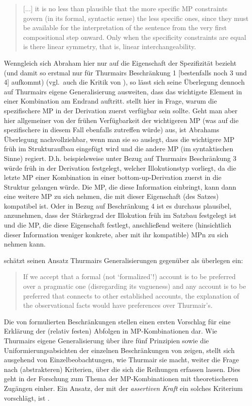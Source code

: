 \begin{quotation}
[...] it is no less than plausible that the more specific MP constraints \\ govern (in its formal, syntactic sense) the less specific ones, since they must be available for the interpretation of the sentence from the very first compositional step onward. Only when the specificity constraints are equal is there linear symmetry, that is, linear interchangeability.
\end{quotation}
Wenngleich sich Abraham hier nur auf die Eigenschaft der Spezifizität bezieht (und damit so erstmal nur für Thurmairs Beschränkung 1 [bestenfalls noch 3 und 4] aufkommt) (vgl.\ auch die Kritik von \citealt[229]{Rinas2006}), so lässt sich seine Überlegung dennoch auf Thurmairs eigene Generalisierung ausweiten, dass das wichtigste Element in einer Kombination am Endrand auftritt. \citet[229]{Rinas2006} stellt hier in Frage, warum die spezifischere MP in der Derivation zuerst verfügbar sein sollte. Geht man aber hier allgemeiner von der frühen Verfügbarkeit der wichtigeren MP (was auf die spezifischere in diesem Fall ebenfalls zu\-treffen würde) aus, ist Abrahams Überlegung nachvollziehbar, wenn man sie so auslegt, dass die wichtigere MP früh im Strukturaufbau eingefügt wird und die andere MP (im syntaktischen Sinne) regiert. D.h. beispielsweise unter Bezug auf Thurmairs Beschränkung 3 würde früh in der Derivation festgelegt, welcher Illokutionstyp vorliegt, da die letzte MP einer Kombination in einer bottom-up-Derivation zuerst in die Struktur gelangen würde. Die MP, die diese Information einbringt, kann dann eine weitere MP zu sich nehmen, die mit dieser Eigenschaft (des Satzes) kompatibel ist. Oder in Bezug auf Beschränkung 4 ist es durchaus plausibel, anzunehmen, dass der Stärkegrad der Illokution früh im Satzbau festgelegt ist und die MP, die diese Eigenschaft festlegt, anschließend weitere (hinsichtlich dieser Information weniger konkrete, aber mit ihr kompatible) MPn zu sich neh\-men kann.

\citet[118]{Abraham1991a} schätzt seinen Ansatz Thurmairs Generalisierungen gegenüber als überlegen ein:
\begin{quotation}
If we accept that a formal (not `formalized'!) account is to be preferred over a pragmatic one (disregarding its vagueness) and any account is to be preferred that connects to other established accounts, the explanation of the observational facts would have preferences over Thurmair’s.
\end{quotation}
Die von \citet{Thurmair1989, Thurmair1991} formulierten Beschränkungen stellen einen ersten Vorschlag für eine Erklärung der (relativ festen) Abfolgen in MP-Kom\-bi\-na\-ti\-on\-en dar. Wie Thurmairs eigene Generalisierung über ihre fünf Prinzipien sowie die Uniformierungsabsichten der einzelnen Beschränkungen von \citet{Abraham1991a} zeigen, stellt sich ausgehend von Einzelbeobachtungen, wie Thurmair sie macht, weiter die Frage nach (abstrakteren) Kriterien, über die sich die Reihungen erfassen lassen. Dies geht in der Forschung zum Thema der MP-Kom\-bi\-na\-ti\-on\-en mit theoretischeren Zugängen einher. Ein Ansatz, der mit der \textit{assertiven Kraft} ein solches Kriterium vorschlägt, ist \citet{Doherty1985, Doherty1987}.

